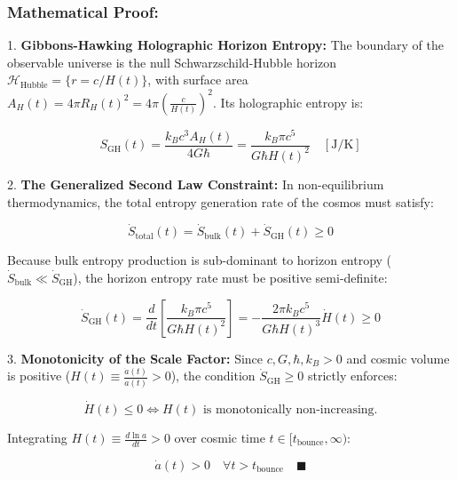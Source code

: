 \documentclass[11pt,a4paper]{article}
\theoremstyle{definition}
\theoremstyle{remark}
\begin{document}
\subsubsection{Mathematical Proof:}
1. \textbf{Gibbons-Hawking Holographic Horizon Entropy:}  
   The boundary of the observable universe is the null Schwarzschild-Hubble horizon $\mathcal{H}_{\text{Hubble}} = \{ r = c/H(t) \}$, with surface area $A_H(t) = 4\pi R_H(t)^2 = 4\pi \left(\frac{c}{H(t)}\right)^2$. Its holographic entropy is:
   
\begin{equation}
S_{\text{GH}}(t) = \frac{k_B c^3 A_H(t)}{4 G \hbar} = \frac{k_B \pi c^5}{G \hbar H(t)^2} \quad [\mathrm{J/K}]
\end{equation}


2. \textbf{The Generalized Second Law Constraint:}  
   In non-equilibrium thermodynamics, the total entropy generation rate of the cosmos must satisfy:
   
\begin{equation}
\dot{S}_{\text{total}}(t) = \dot{S}_{\text{bulk}}(t) + \dot{S}_{\text{GH}}(t) \ge 0
\end{equation}

   Because bulk entropy production is sub-dominant to horizon entropy ($\dot{S}_{\text{bulk}} \ll \dot{S}_{\text{GH}}$), the horizon entropy rate must be positive semi-definite:
   
\begin{equation}
\dot{S}_{\text{GH}}(t) = \frac{d}{dt}[ \frac{k_B \pi c^5}{G \hbar H(t)^2} ] = -\frac{2\pi k_B c^5}{G \hbar H(t)^3} \dot{H}(t) \ge 0
\end{equation}


3. \textbf{Monotonicity of the Scale Factor:}  
   Since $c, G, \hbar, k_B > 0$ and cosmic volume is positive ($H(t) \equiv \frac{\dot{a}(t)}{a(t)} > 0$), the condition $\dot{S}_{\text{GH}} \ge 0$ strictly enforces:
   
\begin{equation}
\dot{H}(t) \le 0 \iff H(t) \text{ is monotonically non-increasing.}
\end{equation}

   Integrating $H(t) \equiv \frac{d \ln a}{dt} > 0$ over cosmic time $t \in [t_{\text{bounce}}, \infty)$:
   
\begin{equation}
\boxed{\dot{a}(t) > 0 \quad \forall t > t_{\text{bounce}} \quad \blacksquare}
\end{equation}
\end{document}
